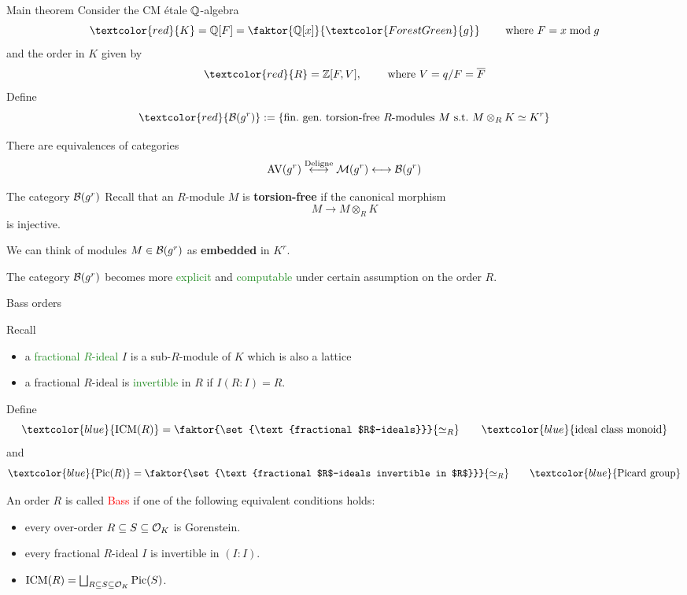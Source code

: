 \documentclass[usenames,dvipsnames,handout]{beamer}
\DeclareMathOperator{\AV}{AV}
\newcommand{\red}[1]{\textcolor{red}{#1}}
\newcommand{\blue}[1]{\textcolor{blue}{#1}}
\newcommand{\green}[1]{\textcolor{ForestGreen}{#1}}
\begin{document}
\begin{frame}{ Main theorem}
Consider the CM \'etale $\mathbb{Q}$-algebra
\[ \red{K} = \Q[F] = \faktor{\Q[x]}{\green{g}} \qquad \text{ where }F=x \mod g \]
\pause and the order in $K$ given by
\[ \red{R} = \Z[F,V], \qquad \text{ where }V=q/F=\overline{F}\]
\pause Define
\[\red{\cB(g^r)}:=\set{ \text{fin.~gen.~torsion-free $R$-modules $M$ s.t.~$M\otimes_R K\simeq K^r$} } \]
\pause
\begin{thm}[M.]
 There are equivalences of categories
 \[ \AV(g^r) \overset{\text{Deligne}}{\longleftrightarrow} \cM(g^r) \longleftrightarrow \cB(g^r) \]
\end{thm}
\end{frame}

\begin{frame}{ The category ${\mathcal B}(g^r)$ }
Recall that an $R$-module $M$ is \textbf{torsion-free} if the canonical morphism
\[ M \to M\otimes_R K \]
is injective.

\pause We can think of modules $M\in {\mathcal B}(g^r)$ as \textbf{embedded} in $K^r$.

\pause The category ${\mathcal B}(g^r)$ becomes more \green{explicit} and \green{computable} under certain assumption on the order $R$.

\end{frame}

\begin{frame}{ Bass orders }

Recall 
\begin{itemize}
 \item a \green{fractional $R$-ideal} $I$ is a sub-$R$-module of $K$ which is also a lattice
 \item a fractional $R$-ideal is \green{invertible} in $R$ if $I(R:I) =R$.
\end{itemize}

Define
\[ \blue{\ICM(R)} = \faktor{\set{\text{fractional $R$-ideals}}}{\simeq_R}\qquad\blue{\text{ideal class monoid}}\]
and
\[ \blue{\Pic(R)} = \faktor{\set{\text{fractional $R$-ideals invertible in $R$}}}{\simeq_R} \qquad\blue{\text{Picard group}} \]

An order $R$ is called \red{Bass} if one of the following equivalent conditions holds:
\begin{itemize}
 \pause \item every over-order $R\subseteq S \subseteq {\mathcal O}_K$ is Gorenstein.
 \pause \item every fractional $R$-ideal $I$ is invertible in $(I:I)$.
 \pause \item $\operatorname{ICM}(R) = \bigsqcup_{R\subseteq S\subseteq {\mathcal O}_K} \operatorname{Pic}(S)$.
\end{itemize}

\end{frame}
\end{document}
